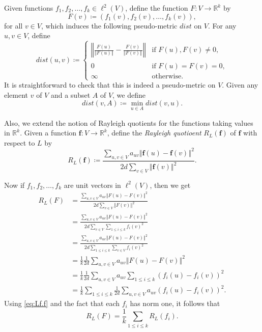 \documentclass[12pt,a4paper,bold]{thesis}
\theoremstyle{definition}
\newcommand*{\map}[3]{#1 \colon #2 \to #3}
\newcommand*{\norm}[2][]{\left\Vert #2 \right\Vert_{#1}}
\begin{document}
Given functions $f_1, f_2, \dots, f_k \in \ell^2(V)$, define the function 
$\map{F}{V}{\mathbb{R}^k}$ by 
\begin{equation*}
    F(v) \coloneq (f_1(v), f_2(v), \dots, f_k(v)),
\end{equation*}
for all $v \in V$, which induces the following pseudo-metric $dist$ on $V$. 
For any $u, v \in V$, define
\begin{equation*}
    dist(u,v) \coloneq
    \begin{cases}
        \norm{\frac{F(u)}{\norm{F(u)}} - \frac{F(v)}{\norm{F(v)}}}
        & \text{if } F(u), F(v) \neq 0,
        \\
        0
        & \text{if } F(u) = F(v) = 0,
        \\
        \infty
        & \text{otherwise}.
    \end{cases} 
\end{equation*}
It is straightforward to check that this is indeed a pseudo-metric on $V$. 
Given any element $v$ of $V$ and a subset $A$ of $V$, we define 
\begin{equation*}
    dist(v, A) \coloneq \min_{u \in A} dist(v,u).
\end{equation*}

Also, we extend the notion of Rayleigh quotients for the functions taking values 
in $\mathbb{R}^k$. Given a function $\map{\mathbf{f}}{V}{\mathbb{R}^k}$, define the 
\emph{Rayleigh quotioent} $R_L(\mathbf{f})$ of $\mathbf{f}$ with respect to $L$ by 
\begin{equation*}
    R_L(\mathbf{f}) \coloneq \frac{\sum_{u,v \in V} a_{uv} \norm{\mathbf{f}(u) 
    - \mathbf{f}(v)}^2}{2d \sum_{v \in V} \norm{\mathbf{f}(v)}^2}.
\end{equation*}

Now if $f_1, f_2, \dots, f_k$ are unit vectors in $\ell^2(V)$, then we get
\begin{align}
    R_L(F) 
    & = 
    \frac{\sum_{u,v \in V} a_{uv} \norm{F(u) - F(v)}^2}{2d \sum_{v \in V} \norm{F(v)}^2} \nonumber
    \\
    & =
    \frac{\sum_{u,v \in V} a_{uv} \norm{F(u) - F(v)}^2}
    {2d \sum_{v \in V} \sum_{1 \leq i \leq k} f_i(v)^2} \nonumber
    \\
    & =
    \frac{\sum_{u,v \in V} a_{uv} \norm{F(u) - F(v)}^2}
    {2d \sum_{1 \leq i \leq k} \sum_{v \in V} f_i(v)^2} \nonumber
    \\
    & =
    \frac{1}{k} \frac{1}{2d} \sum_{u,v \in V} a_{uv} \norm{F(u) - F(v)}^2 \label{eq:RLF}
	\\
	& =
    \frac{1}{k} \frac{1}{2d} \sum_{u,v \in V} a_{uv} \sum_{1 \leq i \leq k} 
    (f_i(u) - f_i(v))^2 \nonumber
	\\
    & =
    \frac{1}{k} \sum_{1 \leq i \leq k} \frac{1}{2d} \sum_{u,v \in V} a_{uv} 
    (f_i(u) - f_i(v))^2. \nonumber
\end{align}
Using \cref{eq:Lf.f} and the fact that each $f_i$ has norm one, it follows that
\begin{equation} \label{eq:RLF-avg-RLf}
    R_L(F) = \frac{1}{k} \sum_{1 \leq i \leq k} R_L(f_i).
\end{equation} 
\end{document}
